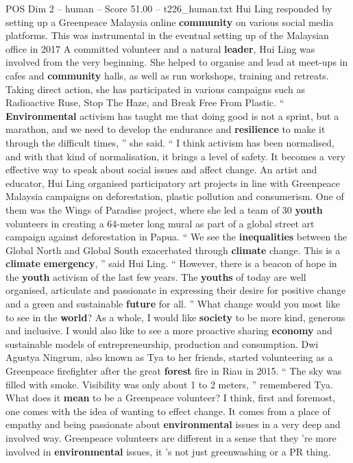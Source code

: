 \begin{textsample}{POS Dim 2 – human – Score 51.00 – t226\_human.txt}
Hui Ling responded by setting up a Greenpeace Malaysia online \textbf{community} on various social media platforms.
This was instrumental in the eventual setting up of the Malaysian office in 2017 A committed volunteer and a natural \textbf{leader}, Hui Ling was involved from the very beginning.
She helped to organise and lead at meet-ups in cafes and \textbf{community} halls, as well as run workshops, training and retreats.
Taking direct action, she has participated in various campaigns such as Radioactive Ruse, Stop The Haze, and Break Free From Plastic. “ \textbf{Environmental} activism has taught me that doing good is not a sprint, but a marathon, and we need to develop the endurance and \textbf{resilience} to make it through the difficult times, ” she said. “ I think activism has been normalised, and with that kind of normalisation, it brings a level of safety.
It becomes a very effective way to speak about social issues and affect change.
An artist and educator, Hui Ling organised participatory art projects in line with Greenpeace Malaysia campaigns on deforestation, plastic pollution and consumerism.
One of them was the Wings of Paradise project, where she led a team of 30 \textbf{youth} volunteers in creating a 64-meter long mural as part of a global street art campaign against deforestation in Papua. “ We see the \textbf{inequalities} between the Global North and Global South exacerbated through \textbf{climate} change.
This is a \textbf{climate} \textbf{emergency}, ” said Hui Ling. “ However, there is a beacon of hope in the \textbf{youth} activism of the last few years.
The \textbf{youths} of today are well organised, articulate and passionate in expressing their desire for positive change and a green and sustainable \textbf{future} for all. ” What change would you most like to see in the \textbf{world}?
As a whole, I would like \textbf{society} to be more kind, generous and inclusive.
I would also like to see a more proactive sharing \textbf{economy} and sustainable models of entrepreneurship, production and consumption.
Dwi Agustya Ningrum, also known as Tya to her friends, started volunteering as a Greenpeace firefighter after the great \textbf{forest} fire in Riau in 2015. “ The sky was filled with smoke.
Visibility was only about 1 to 2 meters, ” remembered Tya.
What does it \textbf{mean} to be a Greenpeace volunteer?
I think, first and foremost, one comes with the idea of wanting to effect change.
It comes from a place of empathy and being passionate about \textbf{environmental} issues in a very deep and involved way.
Greenpeace volunteers are different in a sense that they ’re more involved in \textbf{environmental} issues, it ’s not just greenwashing or a PR thing.

\end{textsample}
